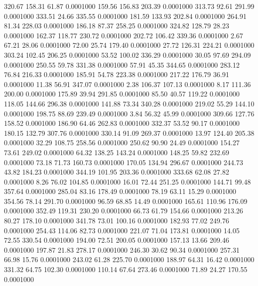  320.67  158.31   61.87   0.0001000
 159.56  156.83  203.39   0.0001000
 313.73   92.61  291.99   0.0001000
 333.51   24.66  335.55   0.0001000
 181.59  133.93  202.84   0.0001000
 264.91   81.34  228.03   0.0001000
 186.18   87.37  258.25   0.0001000
 324.82  128.79   28.23   0.0001000
 162.37  118.77  230.72   0.0001000
 202.72  106.42  339.36   0.0001000
   2.67   67.21   28.06   0.0001000
  72.00   25.74  179.40   0.0001000
  27.72  126.31  224.21   0.0001000
 303.24  102.45  206.25   0.0001000
  53.52  100.02  336.29   0.0001000
  30.05   97.69  294.09   0.0001000
 250.55   59.78  331.38   0.0001000
  57.91   45.35  344.65   0.0001000
 283.12   76.84  216.33   0.0001000
 185.91   54.78  223.38   0.0001000
 217.22  176.79   36.91   0.0001000
  11.38   56.91  347.07   0.0001000
   2.38  106.37  107.13   0.0001000
   8.17  111.36  200.00   0.0001000
 175.89   39.94  291.85   0.0001000
  85.50   40.57  119.22   0.0001000
 118.05  144.66  296.38   0.0001000
 141.88   73.34  340.28   0.0001000
 219.02   55.29  144.10   0.0001000
 198.75   88.69  239.49   0.0001000
   3.84   56.32   45.99   0.0001000
 309.66  127.76  158.52   0.0001000
 186.90   64.46  262.83   0.0001000
 332.37   53.52   90.17   0.0001000
 180.15  132.79  307.76   0.0001000
 330.14   91.09  269.37   0.0001000
  13.97  124.40  205.38   0.0001000
  32.29  108.75  258.56   0.0001000
 250.62   90.90   24.49   0.0001000
 154.27   73.61  249.02   0.0001000
  64.32  138.25  143.24   0.0001000
 148.25   59.82  232.69   0.0001000
  73.18   71.73  160.73   0.0001000
 170.05  134.94  296.67   0.0001000
 244.73   43.82  184.23   0.0001000
 344.19  101.95  203.36   0.0001000
 333.68   62.08   27.82   0.0001000
   8.26   76.02  104.85   0.0001000
  16.01   72.44  251.25   0.0001000
 144.71   99.48  357.64   0.0001000
 285.04   83.16  178.49   0.0001000
  78.19   63.11   15.29   0.0001000
 354.56   78.14  291.70   0.0001000
  96.59   68.85   14.49   0.0001000
 165.61  110.96  176.09   0.0001000
 352.49  119.31  230.20   0.0001000
  66.73   61.79  154.66   0.0001000
 213.26   80.27  178.10   0.0001000
 341.78   73.01  100.16   0.0001000
 182.93   77.02  249.76   0.0001000
 254.43  114.06   82.73   0.0001000
 221.07   71.04  173.81   0.0001000
  14.05   72.55  330.54   0.0001000
 194.00   72.51  200.05   0.0001000
 157.13   13.66  209.46   0.0001000
 197.87   21.83  278.17   0.0001000
 246.30   30.62   90.34   0.0001000
 257.31   66.98   15.76   0.0001000
 243.02   61.28  225.70   0.0001000
 188.97   64.31   16.42   0.0001000
 331.32   64.75  102.30   0.0001000
 110.14   67.64  273.46   0.0001000
  71.89   24.27  170.55   0.0001000

